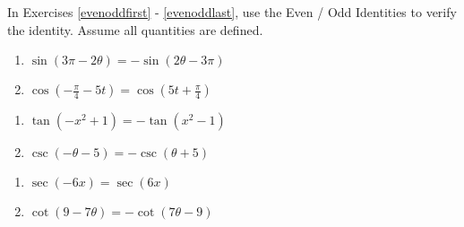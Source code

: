 \documentclass{ximera}
\begin{document}
	\author{Stitz-Zeager}



In Exercises \ref{evenoddfirst} - \ref{evenoddlast}, use the Even / Odd Identities to verify the identity.  Assume all quantities are defined.

\begin{multicols}{2}

\begin{enumerate}

\item $\sin(3\pi - 2\theta) = -\sin(2\theta - 3\pi)$  \label{evenoddfirst}
\item $\cos \left( -\frac{\pi}{4} - 5t \right) = \cos \left( 5t + \frac{\pi}{4} \right)$

\setcounter{HW}{\value{enumi}}

\end{enumerate}

\end{multicols}

\begin{multicols}{2}

\begin{enumerate}

\setcounter{enumi}{\value{HW}}

\item $\tan(-x^{2} + 1) = -\tan(x^{2} - 1)$
\item $\csc(-\theta - 5) = -\csc(\theta + 5)$

\setcounter{HW}{\value{enumi}}

\end{enumerate}

\end{multicols}

\begin{multicols}{2}

\begin{enumerate}

\setcounter{enumi}{\value{HW}}

\item $\sec(-6x) = \sec(6x)$
\item $\cot(9 - 7\theta) = -\cot(7\theta - 9)$ \label{evenoddlast}

\setcounter{HW}{\value{enumi}}

\end{enumerate}

\end{multicols}
\end{document}
